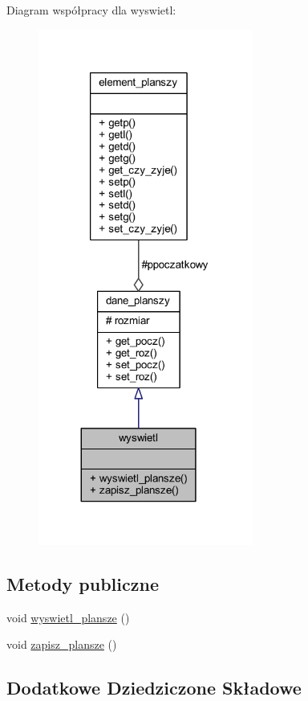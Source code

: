 Diagram współpracy dla wyswietl\+:
\nopagebreak
\begin{figure}[H]
\begin{center}
\leavevmode
\includegraphics[width=200pt]{classwyswietl__coll__graph}
\end{center}
\end{figure}
\subsection*{Metody publiczne}
\begin{DoxyCompactItemize}
\item 
void \mbox{\hyperlink{classwyswietl_a288a22bd278a0944739e792f3f2494fa}{wyswietl\+\_\+plansze}} ()
\item 
void \mbox{\hyperlink{classwyswietl_ac772602890ae0255a8ecc616f214b3db}{zapisz\+\_\+plansze}} ()
\end{DoxyCompactItemize}
\subsection*{Dodatkowe Dziedziczone Składowe}


